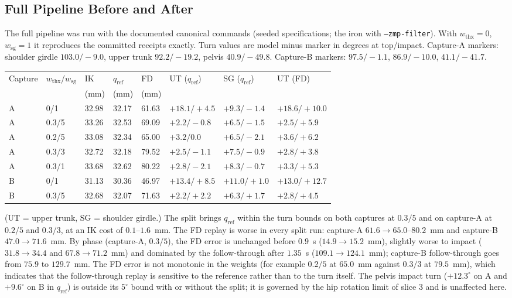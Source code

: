 \documentclass[11pt,a4paper]{article}
\begin{document}
\subsection{Full Pipeline Before and After}
The full pipeline was run with the documented canonical commands (seeded specifications; the iron with \texttt{--zmp-filter}). With $w_{\mathrm{thx}}=0$, $w_{\mathrm{sg}}=1$ it reproduces the committed receipts exactly. Turn values are model minus marker in degrees at top/impact. Capture-A markers: shoulder girdle $103.0/-9.0$, upper trunk $92.2/-19.2$, pelvis $40.9/-49.8$. Capture-B markers: $97.5/-1.1$, $86.9/-10.0$, $41.1/-41.7$.
\begin{center}
\small
\begin{tabular}{llllllll}
\hline
Capture & $w_{\mathrm{thx}}$/$w_{\mathrm{sg}}$ & IK & $q_{\mathrm{ref}}$ & FD & UT ($q_{\mathrm{ref}}$) & SG ($q_{\mathrm{ref}}$) & UT (FD) \\
 & & (mm) & (mm) & (mm) & & & \\
\hline
A & 0/1 & 32.98 & 32.17 & 61.63 & $+18.1/+4.5$ & $+9.3/-1.4$ & $+18.6/+10.0$ \\
A & 0.3/5 & 33.26 & 32.53 & 69.09 & $+2.2/-0.8$ & $+6.5/-1.5$ & $+2.5/+5.9$ \\
A & 0.2/5 & 33.08 & 32.34 & 65.00 & $+3.2/0.0$ & $+6.5/-2.1$ & $+3.6/+6.2$ \\
A & 0.3/3 & 32.72 & 32.18 & 79.52 & $+2.5/-1.1$ & $+7.5/-0.9$ & $+2.8/+3.8$ \\
A & 0.3/1 & 33.68 & 32.62 & 80.22 & $+2.8/-2.1$ & $+8.3/-0.7$ & $+3.3/+5.3$ \\
B & 0/1 & 31.13 & 30.36 & 46.97 & $+13.4/+8.5$ & $+11.0/+1.0$ & $+13.0/+12.7$ \\
B & 0.3/5 & 32.68 & 32.07 & 71.63 & $+2.2/+2.2$ & $+6.3/+1.7$ & $+2.8/+4.5$ \\
\hline
\end{tabular}
\end{center}
(UT = upper trunk, SG = shoulder girdle.) The split brings $q_{\mathrm{ref}}$ within the turn bounds on both captures at $0.3/5$ and on capture-A at $0.2/5$ and $0.3/3$, at an IK cost of $0.1$--$1.6$~mm. The FD replay is worse in every split run: capture-A $61.6\to65.0$--$80.2$~mm and capture-B $47.0\to71.6$~mm. By phase (capture-A, $0.3/5$), the FD error is unchanged before $0.9$~s ($14.9\to15.2$~mm), slightly worse to impact ($31.8\to34.4$ and $67.8\to71.2$~mm) and dominated by the follow-through after $1.35$~s ($109.1\to124.1$~mm); capture-B follow-through goes from $75.9$ to $129.7$~mm. The FD error is not monotonic in the weights (for example $0.2/5$ at $65.0$~mm against $0.3/3$ at $79.5$~mm), which indicates that the follow-through replay is sensitive to the reference rather than to the turn itself. The pelvis impact turn ($+12.3^\circ$ on A and $+9.6^\circ$ on B in $q_{\mathrm{ref}}$) is outside its $5^\circ$ bound with or without the split; it is governed by the hip rotation limit of slice 3 and is unaffected here.
\end{document}
